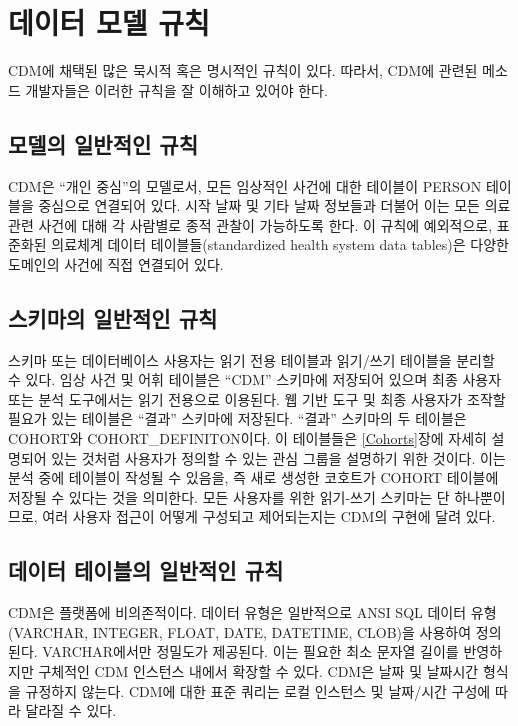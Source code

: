 \documentclass[11pt]{book}
\theoremstyle{definition}
\theoremstyle{definition}
\theoremstyle{definition}
\theoremstyle{remark}
\begin{document}
\section{데이터 모델 규칙}\label{--}

CDM에 채택된 많은 묵시적 혹은 명시적인 규칙이 있다. 따라서, CDM에 관련된
메소드 개발자들은 이러한 규칙을 잘 이해하고 있어야 한다.

\subsection{모델의 일반적인 규칙}\label{model-Conv}

CDM은 ``개인 중심''의 모델로서, 모든 임상적인 사건에 대한 테이블이
PERSON 테이블을 중심으로 연결되어 있다. 시작 날짜 및 기타 날짜 정보들과
더불어 이는 모든 의료 관련 사건에 대해 각 사람별로 종적 관찰이
가능하도록 한다. 이 규칙에 예외적으로, 표준화된 의료체계 데이터
테이블들(standardized health system data tables)은 다양한 도메인의
사건에 직접 연결되어 있다.

\subsection{스키마의 일반적인 규칙}\label{--}

스키마 또는 데이터베이스 사용자는 읽기 전용 테이블과 읽기/쓰기 테이블을
분리할 수 있다. 임상 사건 및 어휘 테이블은 ``CDM'' 스키마에 저장되어
있으며 최종 사용자 또는 분석 도구에서는 읽기 전용으로 이용된다. 웹 기반
도구 및 최종 사용자가 조작할 필요가 있는 테이블은 ``결과'' 스키마에
저장된다. ``결과'' 스키마의 두 테이블은 COHORT와 COHORT\_DEFINITON이다.
이 테이블들은 \ref{Cohorts}장에 자세히 설명되어 있는 것처럼 사용자가
정의할 수 있는 관심 그룹을 설명하기 위한 것이다. 이는 분석 중에 테이블이
작성될 수 있음을, 즉 새로 생성한 코호트가 COHORT 테이블에 저장될 수
있다는 것을 의미한다. 모든 사용자를 위한 읽기-쓰기 스키마는 단
하나뿐이므로, 여러 사용자 접근이 어떻게 구성되고 제어되는지는 CDM의
구현에 달려 있다.

\subsection{데이터 테이블의 일반적인 규칙}\label{---}

CDM은 플랫폼에 비의존적이다. 데이터 유형은 일반적으로 ANSI SQL 데이터
유형(VARCHAR, INTEGER, FLOAT, DATE, DATETIME, CLOB)을 사용하여 정의된다.
VARCHAR에서만 정밀도가 제공된다. 이는 필요한 최소 문자열 길이를
반영하지만 구체적인 CDM 인스턴스 내에서 확장할 수 있다. CDM은 날짜 및
날짜시간 형식을 규정하지 않는다. CDM에 대한 표준 쿼리는 로컬 인스턴스 및
날짜/시간 구성에 따라 달라질 수 있다.
\end{document}
